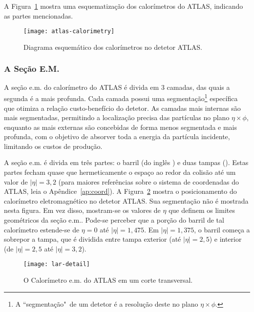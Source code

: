 A Figura~\ref{fig:calo-general} mostra uma esquematização dos calorímetros do
ATLAS, indicando as partes mencionadas.

\begin{figure}
\begin{center}
\texttt{[image: atlas-calorimetry]}
\end{center}
\caption{Diagrama esquemático dos calorímetros no detetor ATLAS.}
\label{fig:calo-general}
\end{figure}

\subsubsection{A Seção E.M.}

A seção e.m. do calorímetro do ATLAS é divida em 3 camadas, das quais a
segunda é a mais profunda. Cada camada possui uma segmentação\footnote{A
``segmentação"\ de um detetor é a resolução deste no plano $\eta\times\phi$.} 
específica que otimiza a relação custo-benefício do detetor. As camadas mais
internas são mais segmentadas, permitindo a localização precisa das partículas
no plano $\eta\times\phi$, enquanto as mais externas são concebidas de forma
menos segmentada e mais profunda, com o objetivo de absorver toda a energia da
partícula incidente, limitando os custos de produção.

A seção e.m. é divida em três partes: o barril (do inglês
) e duas tampas (). Estas partes fecham quase que
hermeticamente o espaço ao redor da colisão até um valor de $|\eta|=3,2$ (para
maiores referências sobre o sistema de coordenadas do ATLAS, leia o
Apêndice~\ref{ap:coord}). A Figura~\ref{fig:lar-pos} mostra o posicionamento
do calorímetro eletromagnético no detetor ATLAS. Sua segmentação não é
mostrada nesta figura. Em vez disso, mostram-se os valores de $\eta$ que
definem os limites geométricos da seção e.m.. Pode-se perceber que a porção do
barril de tal calorímetro estende-se de $\eta=0$ até $|\eta|=1,475$. Em
$|\eta|=1,375$, o barril começa a sobrepor a tampa, que é dividida entre tampa
exterior (até $|\eta|=2,5$) e interior (de $|\eta|=2,5$ até $|\eta|=3,2$).

\begin{figure}
\begin{center}
\texttt{[image: lar-detail]}
\end{center}
\caption{O Calorímetro e.m. do ATLAS em um corte transversal.}
\label{fig:lar-pos}
\end{figure}

